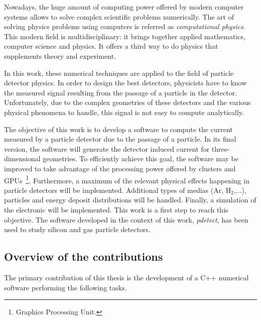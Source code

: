 \documentclass[11pt]{article}
\begin{document}
	Nowadays, the huge amount of computing power offered by modern computer systems allows
	to solve complex scientific problems numerically. The art of solving physics problems using
	computers is referred as \textit{computational physics}. This modern field
	is multidisciplinary: it brings together applied mathematics,
	computer science and physics. It offers a third way to do physics
	that supplements theory and experiment.

	In this work, these numerical techniques are applied to the field of particle
	detector physics. In order to design the best detectors,
	physicists have to know the measured signal resulting from the passage of a particle
	in the detector. Unfortunately, due to the complex geometries of these detectors
	and the various physical phenomena to handle, this signal is not easy
	to compute analytically.

	The objective of this work is to develop a software to compute the current measured
	by a particle detector due to the passage of a particle. In its final version,
	the software will generate the detector induced current for three-dimensional
	geometries. To efficiently achieve this goal, the software may be improved
	to take advantage of the processing power offered by clusters and GPUs~\footnote{Graphics Processing Unit.}.
	Furthermore, a maximum of the relevant physical effects happening
	in particle detectors will be implemented.
	Additional types of medias (Ar, H$_2$,...), particles and energy deposit
	distributions will be handled. Finally, a simulation of the electronic will
	be implemented. This work is a first step to reach this objective.
	The software developed in the context of this work, \textit{pdetect},
	has been used to study silicon and gas particle detectors.


	\subsection*{Overview of the contributions}

		The primary contribution of this thesis is the development of a C++ numerical software performing the
		following tasks.
\end{document}
